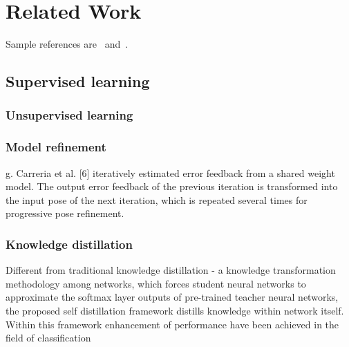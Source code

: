 \setcounter{chapter}{1}

\chapter{Related Work}



Sample references are~\cite{Zwicker04Perspective} and~\cite{Altman89QuaternionScandal}.

\section{Supervised learning }



\subsection{Unsupervised learning}

\subsection{Model refinement}
g. Carreria et al. [6] iteratively estimated error feedback from a shared weight model.
The output error feedback of the previous iteration is transformed into the input pose of the next iteration, which is
repeated several times for progressive pose refinement.
\subsection{Knowledge distillation}
Different from traditional knowledge distillation - a knowledge transformation methodology among networks, which forces student neural networks to approximate the softmax layer outputs of pre-trained teacher neural networks, the proposed self distillation framework distills knowledge within network itself. Within this framework enhancement of performance have been achieved in the field of classification \cite{DBLP:journals/corr/abs-1905-08094}